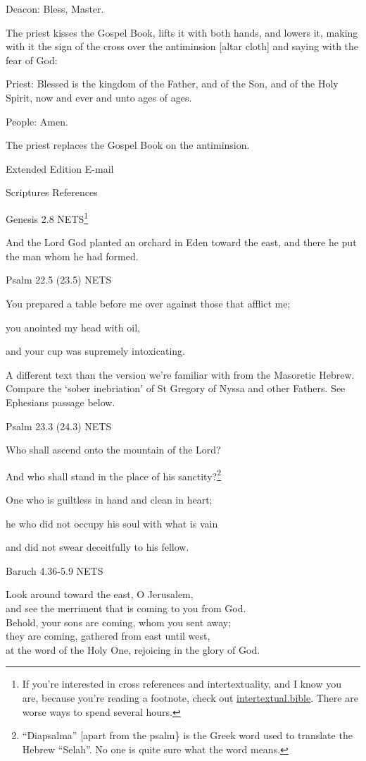 \documentclass[
]{article}
\begin{document}
Deacon: Bless, Master.

The priest kisses the Gospel Book, lifts it with both hands, and lowers
it, making with it the sign of the cross over the antiminsion {[}altar
cloth{]} and saying with the fear of God:

Priest: Blessed is the kingdom of the Father, and of the Son, and of the
Holy Spirit, now and ever and unto ages of ages.

People: Amen.

The priest replaces the Gospel Book on the antiminsion.

Extended Edition E-mail

Scriptures References

Genesis 2.8 NETS\footnote{If you're interested in cross references and
  intertextuality, and I know you are, because you're reading a
  footnote, check out
  \href{http://intertextual.bible}{\ul{intertextual.bible}}. There are
  worse ways to spend several hours.}

And the Lord God planted an orchard in Eden toward the east, and there
he put the man whom he had formed.

Psalm 22.5 (23.5) NETS

You prepared a table before me over against those that afflict me;

you anointed my head with oil,

and your cup was supremely intoxicating.

A different text than the version we're familiar with from the Masoretic
Hebrew. Compare the `sober inebriation' of St Gregory of Nyssa and other
Fathers. See Ephesians passage below.

Psalm 23.3 (24.3) NETS

Who shall ascend onto the mountain of the Lord?

And who shall stand in the place of his sanctity?\footnote{``Diapsalma''
  {[}apart from the psalm\} is the Greek word used to translate the
  Hebrew ``Selah''. No one is quite sure what the word means.}

One who is guiltless in hand and clean in heart;

he who did not occupy his soul with what is vain

and did not swear deceitfully to his fellow.

Baruch 4.36-5.9 NETS

Look around toward the east, O Jerusalem,\\
and see the merriment that is coming to you from God.\\
Behold, your sons are coming, whom you sent away;\\
they are coming, gathered from east until west,\\
at the word of the Holy One, rejoicing in the glory of God.
\end{document}
